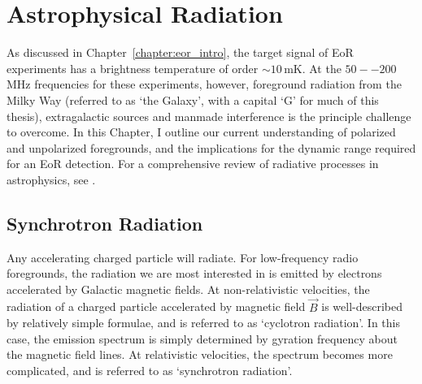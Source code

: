 \chapter{Astrophysical Radiation}
\label{chapter:astro_rad}

As discussed in Chapter~\ref{chapter:eor_intro}, the target signal of EoR experiments has a brightness temperature of order $\sim 10$\,mK. At the $50--200$\,MHz frequencies for these experiments, however, foreground radiation from the Milky Way (referred to as `the Galaxy', with a capital `G' for much of this thesis), extragalactic sources and manmade interference  is the principle challenge to overcome. In this Chapter, I outline our current understanding of polarized and unpolarized foregrounds, and the implications for the dynamic range required for an EoR detection. For a comprehensive review of radiative processes in astrophysics, see \cite{Rybicki.79}.

\section{Synchrotron Radiation}

Any accelerating charged particle will radiate. For low-frequency radio foregrounds, the radiation we are most interested in is emitted by electrons accelerated by Galactic magnetic fields.
At non-relativistic velocities, the radiation of a charged particle accelerated by magnetic field $\vec{B}$ is well-described by relatively simple formulae, and is referred to as `cyclotron radiation'. In this case, the emission spectrum is simply determined by gyration frequency about the magnetic field lines.
At relativistic velocities, the spectrum becomes more complicated, and is referred to as `synchrotron radiation'.

